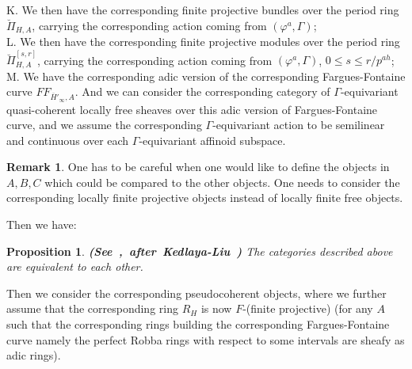 \documentclass[12pt]{amsart}
\newtheorem{proposition}[theorem]{Proposition}
\theoremstyle{definition}
\newtheorem{remark}[theorem]{Remark}
\numberwithin{equation}{section}
\begin{document}
\noindent K. We then have the corresponding finite projective bundles over the period ring ${\breve{\Pi}}_{H,A}$, carrying the corresponding action coming from $(\varphi^a,\Gamma)$;\\
\noindent L. We then have the corresponding finite projective modules over the period ring ${\breve{\Pi}}^{[s,r]}_{H,A}$, carrying the corresponding action coming from $(\varphi^a,\Gamma)$, $0\leq s\leq r/p^{ah}$;\\
\noindent M. We have the corresponding adic version of the corresponding Fargues-Fontaine curve $FF_{\overline{H}'_\infty,A}$. And we can consider the corresponding category of $\Gamma$-equivariant quasi-coherent locally free sheaves over this adic version of Fargues-Fontaine curve, and we assume the corresponding $\Gamma$-equivariant action to be semilinear and continuous over each $\Gamma$-equivariant affinoid subspace.


\begin{remark}
One has to be careful when one would like to define the objects in $A,B,C$ which could be compared to the other objects. One needs to consider the corresponding locally finite projective objects instead of locally finite free objects.	
\end{remark}



\indent Then we have:


\begin{proposition}\mbox{\bf{(See \cite[Proposition 5.44]{XT2}, after Kedlaya-Liu \cite[Theorem 5.7.4]{KL16})}}
The categories described above are equivalent to each other.	
\end{proposition}






\indent Then we consider the corresponding pseudocoherent objects, where we further assume that the corresponding ring $R_H$ is now $F$-(finite projective) (for any $A$ such that the corresponding rings building the corresponding Fargues-Fontaine curve namely the perfect Robba rings with respect to some intervals are sheafy as adic rings).
\end{document}
